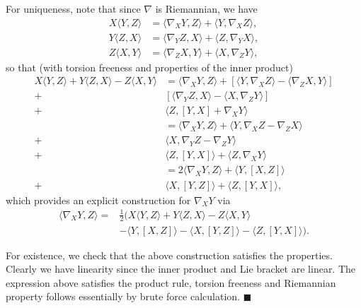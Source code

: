 \documentclass[letter-paper]{tufte-book}
\newenvironment{proof}[1][Proof]{\begin{trivlist}
\item[\hskip \labelsep {\bfseries #1}]}{\end{trivlist}}
\newcommand{\qed}{\hfill$\blacksquare$}
\begin{document}
\begin{proof}

  For uniqueness, note that since $\nabla$ is Riemannian, we have
  \begin{align*}
    X\langle Y,Z\rangle &= \langle \nabla_X Y, Z\rangle + \langle Y, \nabla_X Z\rangle,\\
    Y\langle Z,X\rangle &= \langle \nabla_Y Z, X\rangle + \langle Z, \nabla_Y X\rangle,\\
    Z\langle X,Y\rangle &= \langle \nabla_Z X, Y\rangle + \langle X, \nabla_Z Y\rangle,
  \end{align*}
  so that (with torsion freeness and properties of the inner product)
  \begin{align*}
    X\langle Y,Z\rangle + Y\langle Z,X\rangle - Z\langle X,Y\rangle
      &= \langle \nabla_X Y, Z\rangle + [\langle Y, \nabla_X Z\rangle - \langle \nabla_Z X, Y\rangle] \\
      +& [\langle \nabla_Y Z, X\rangle - \langle X, \nabla_Z Y\rangle] \\
      +& \langle Z, [Y,X] + \nabla_X Y\rangle\\
      &= \langle \nabla_X Y, Z\rangle + \langle Y, \nabla_X Z - \nabla_Z X\rangle\\
      +& \langle X, \nabla_Y Z - \nabla_Z Y\rangle\\
      +& \langle Z, [Y,X]\rangle + \langle Z, \nabla_X Y\rangle\\
      &= 2\langle \nabla_X Y, Z\rangle + \langle Y, [X,Z]\rangle\\
      +& \langle X, [Y,Z]\rangle + \langle Z, [Y,X]\rangle,
  \end{align*}
  which provides an explicit construction for $\nabla_X Y$ via
  \begin{equation}\begin{aligned}\label{eq:covariant}
    \langle \nabla_X Y, Z\rangle = 
      &\frac{1}{2}( X\langle Y, Z\rangle + Y\langle Z,X \rangle - Z\langle X,Y \rangle \\
      &-\langle Y, [X,Z]\rangle - \langle X, [Y,Z]\rangle - \langle Z, [Y,X]\rangle).
  \end{aligned}\end{equation}
  
  For existence, we check that the above construction satisfies the properties. Clearly we have linearity since the inner product and Lie bracket are linear. The expression above satisfies the product rule, torsion freeness and Riemannian property follows essentially by brute force calculation. \qed
\end{proof}
\end{document}

